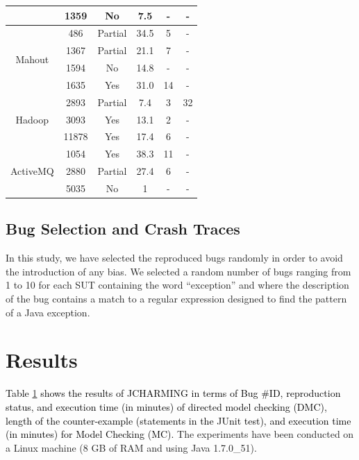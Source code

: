 \documentclass[times, doublespace]{smrauth}
\newcommand{\red}[1]{\textcolor{black}{#1}}
\begin{document}
{\begin{table}[H]
\begin{tabular}{c|c|c|c|c|c}
                            & 1359     & No      & 7.5    & -    & - \\ \hline
\multirow{4}{*}{Mahout}     & 486      & Partial & 34.5   & 5    & -        \\
                            & 1367     & Partial & 21.1   & 7  & -       \\
                            & 1594 	   & No 	 & 14.8 	  & -  & -       \\
                            & 1635     & Yes     & 31.0   & 14  & - \\ \hline
\multirow{3}{*}{Hadoop}     & 2893     & Partial & 7.4    & 3  & 32       \\
						    & 3093      & Yes 	   & 13.1     & 2     & -   \\
                            & 11878    & Yes 	 & 17.4     & 6 & - \\  \hline
\multirow{3}{*}{ActiveMQ}   & 1054     & Yes     & 38.3   & 11  & -      \\
						    & 2880      & Partial  & 27.4    & 6    & -       \\
                            & 5035     & No 	 & 1  & -  & - \\  \hline \hline
\end{tabular}


\label{tab:jcharming-results}
\end{table}


\subsection{Bug Selection and Crash Traces}

In this study, we have selected the reproduced bugs randomly
in order to avoid the introduction of any bias. We selected a
random number of bugs ranging from 1 to 10 for each SUT containing the word ``exception'' and where the description of
the bug contains a match to a regular expression designed to find the pattern of a
Java exception.

\section{Results\label{sec:results}}

\red{Table \ref{tab:jcharming-results} shows the results of JCHARMING in terms of Bug
\#ID, reproduction status, and execution time (in minutes) of
directed model checking (DMC), length of the counter-example (statements in the JUnit test), and  execution time (in minutes) for Model Checking (MC).}
The experiments have been conducted on a Linux machine (8
GB of RAM and using Java 1.7.0\_51).

}
\end{document}
